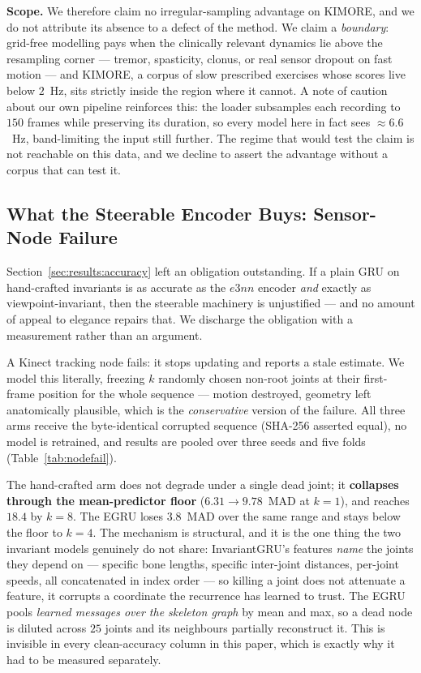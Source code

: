 \documentclass[10pt,journal]{IEEEtran}
\begin{document}
\textbf{Scope.} We therefore claim no irregular-sampling advantage on KIMORE, and we do not attribute
its absence to a defect of the method. We claim a \emph{boundary}: grid-free modelling pays when the
clinically relevant dynamics lie above the resampling corner --- tremor, spasticity, clonus, or real
sensor dropout on fast motion --- and KIMORE, a corpus of slow prescribed exercises whose scores live
below $2$~Hz, sits strictly inside the region where it cannot. A note of caution about our own
pipeline reinforces this: the loader subsamples each recording to $150$ frames while preserving its
duration, so every model here in fact sees $\approx\!6.6$~Hz, band-limiting the input still further.
The regime that would test the claim is not reachable on this data, and we decline to assert the
advantage without a corpus that can test it.

\subsection{What the Steerable Encoder Buys: Sensor-Node Failure}
\label{sec:results:nodefail}

Section~\ref{sec:results:accuracy} left an obligation outstanding. If a plain GRU on hand-crafted
invariants is as accurate as the $e3nn$ encoder \emph{and} exactly as viewpoint-invariant, then the
steerable machinery is unjustified --- and no amount of appeal to elegance repairs that. We discharge
the obligation with a measurement rather than an argument.

A Kinect tracking node fails: it stops updating and reports a stale estimate. We model this
literally, freezing $k$ randomly chosen non-root joints at their first-frame position for the whole
sequence --- motion destroyed, geometry left anatomically plausible, which is the \emph{conservative}
version of the failure. All three arms receive the byte-identical corrupted sequence (SHA-256 asserted
equal), no model is retrained, and results are pooled over three seeds and five folds
(Table~\ref{tab:nodefail}).

The hand-crafted arm does not degrade under a single dead joint; it \textbf{collapses through the
mean-predictor floor} ($6.31\!\to\!9.78$~MAD at $k=1$), and reaches $18.4$ by $k=8$. The EGRU loses
$3.8$~MAD over the same range and stays below the floor to $k=4$. The mechanism is structural, and it
is the one thing the two invariant models genuinely do not share: InvariantGRU's features
\emph{name} the joints they depend on --- specific bone lengths, specific inter-joint distances,
per-joint speeds, all concatenated in index order --- so killing a joint does not attenuate a feature,
it corrupts a coordinate the recurrence has learned to trust. The EGRU pools \emph{learned messages
over the skeleton graph} by mean and max, so a dead node is diluted across $25$ joints and its
neighbours partially reconstruct it. This is invisible in every clean-accuracy column in this paper,
which is exactly why it had to be measured separately.
\end{document}
